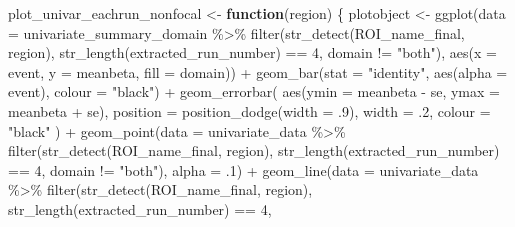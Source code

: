 \documentclass[
]{article}
\newenvironment{Shaded}{\begin{snugshade}}{\end{snugshade}}
\newcommand{\AttributeTok}[1]{\textcolor[rgb]{0.77,0.63,0.00}{#1}}
\newcommand{\ControlFlowTok}[1]{\textcolor[rgb]{0.13,0.29,0.53}{\textbf{#1}}}
\newcommand{\DecValTok}[1]{\textcolor[rgb]{0.00,0.00,0.81}{#1}}
\newcommand{\FunctionTok}[1]{\textcolor[rgb]{0.00,0.00,0.00}{#1}}
\newcommand{\NormalTok}[1]{#1}
\newcommand{\OtherTok}[1]{\textcolor[rgb]{0.56,0.35,0.01}{#1}}
\newcommand{\SpecialCharTok}[1]{\textcolor[rgb]{0.00,0.00,0.00}{#1}}
\newcommand{\StringTok}[1]{\textcolor[rgb]{0.31,0.60,0.02}{#1}}
\begin{document}
\begin{Shaded}
\begin{Highlighting}[]
\NormalTok{plot\_univar\_eachrun\_nonfocal }\OtherTok{\textless{}{-}} \ControlFlowTok{function}\NormalTok{(region) \{}
\NormalTok{  plotobject }\OtherTok{\textless{}{-}}
    \FunctionTok{ggplot}\NormalTok{(}\AttributeTok{data =}\NormalTok{ univariate\_summary\_domain }\SpecialCharTok{\%\textgreater{}\%}
             \FunctionTok{filter}\NormalTok{(}\FunctionTok{str\_detect}\NormalTok{(ROI\_name\_final, region),}
                    \FunctionTok{str\_length}\NormalTok{(extracted\_run\_number) }\SpecialCharTok{==} \DecValTok{4}\NormalTok{,}
\NormalTok{                    domain }\SpecialCharTok{!=} \StringTok{"both"}\NormalTok{), }
           \FunctionTok{aes}\NormalTok{(}\AttributeTok{x =}\NormalTok{ event, }\AttributeTok{y =}\NormalTok{ meanbeta, }\AttributeTok{fill =}\NormalTok{ domain)) }\SpecialCharTok{+}
    \FunctionTok{geom\_bar}\NormalTok{(}\AttributeTok{stat =} \StringTok{"identity"}\NormalTok{, }\FunctionTok{aes}\NormalTok{(}\AttributeTok{alpha =}\NormalTok{ event), }\AttributeTok{colour =} \StringTok{"black"}\NormalTok{) }\SpecialCharTok{+}
    \FunctionTok{geom\_errorbar}\NormalTok{(}
      \FunctionTok{aes}\NormalTok{(}\AttributeTok{ymin =}\NormalTok{ meanbeta }\SpecialCharTok{{-}}\NormalTok{ se, }\AttributeTok{ymax =}\NormalTok{ meanbeta }\SpecialCharTok{+}\NormalTok{ se),}
      \AttributeTok{position =} \FunctionTok{position\_dodge}\NormalTok{(}\AttributeTok{width =}\NormalTok{ .}\DecValTok{9}\NormalTok{),}
      \AttributeTok{width =}\NormalTok{ .}\DecValTok{2}\NormalTok{,}
      \AttributeTok{colour =} \StringTok{"black"}
\NormalTok{    ) }\SpecialCharTok{+}
    \FunctionTok{geom\_point}\NormalTok{(}\AttributeTok{data =}\NormalTok{ univariate\_data }\SpecialCharTok{\%\textgreater{}\%} 
             \FunctionTok{filter}\NormalTok{(}\FunctionTok{str\_detect}\NormalTok{(ROI\_name\_final, region),}
                    \FunctionTok{str\_length}\NormalTok{(extracted\_run\_number) }\SpecialCharTok{==} \DecValTok{4}\NormalTok{,}
\NormalTok{                    domain }\SpecialCharTok{!=} \StringTok{"both"}\NormalTok{), }
             \AttributeTok{alpha =}\NormalTok{ .}\DecValTok{1}\NormalTok{) }\SpecialCharTok{+}
    \FunctionTok{geom\_line}\NormalTok{(}\AttributeTok{data =}\NormalTok{ univariate\_data }\SpecialCharTok{\%\textgreater{}\%} 
             \FunctionTok{filter}\NormalTok{(}\FunctionTok{str\_detect}\NormalTok{(ROI\_name\_final, region),}
                    \FunctionTok{str\_length}\NormalTok{(extracted\_run\_number) }\SpecialCharTok{==} \DecValTok{4}\NormalTok{,}

\end{Highlighting}
\end{Shaded}
\end{document}
